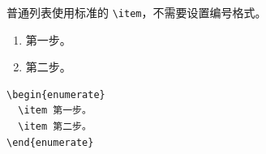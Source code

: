 \documentclass[nowatermark]{homework}
\begin{document}
\newpage
{}
普通列表使用标准的 \texttt{\textbackslash item}，不需要设置编号格式。
\begin{enumerate}
  \item 第一步。
  \item 第二步。
\end{enumerate}
\begin{lstlisting}[language={[LaTeX]TeX},basicstyle=\ttfamily\footnotesize,numbers=none]
\begin{enumerate}
  \item 第一步。
  \item 第二步。
\end{enumerate}
\end{lstlisting}
\end{document}
